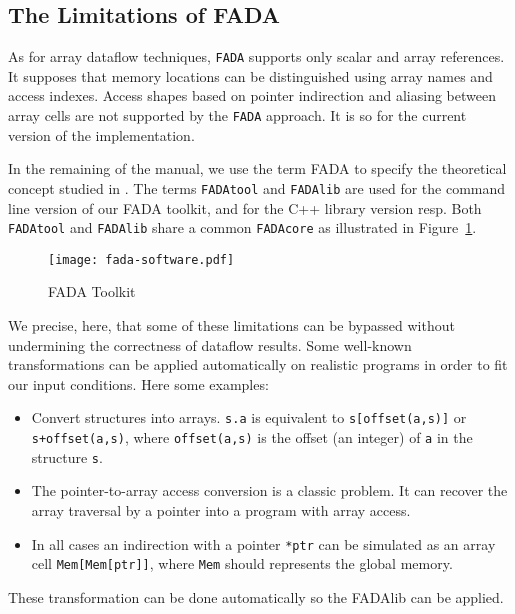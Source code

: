 \subsection{The Limitations of FADA}
As for array dataflow techniques, \verb|FADA| supports only scalar and array references. It supposes that memory locations can be distinguished using array names and access indexes. Access shapes based on pointer indirection and aliasing between array cells are not supported by the \verb|FADA| approach. It is so for the current version of the implementation.

In the remaining of the manual, we use the term FADA to specify the theoretical concept studied in \cite{barthou_thesis}. The terms \verb|FADAtool| and \verb|FADAlib| are used for the command line version of our FADA toolkit, and for the C++ library version resp. Both \verb|FADAtool| and \verb|FADAlib| share a common \verb|FADAcore| as illustrated in Figure~\ref{fig:fadatoolkit}.
\begin{figure}
\begin{center}
 \texttt{[image: fada-software.pdf]}
\end{center}
\caption{FADA Toolkit}
\label{fig:fadatoolkit}
\end{figure} 

We precise, here, that some of these limitations can be bypassed without undermining the correctness of dataflow results. Some well-known transformations can be applied automatically on realistic programs in order to fit our input conditions. Here some examples:
\begin{itemize}
 \item Convert structures into arrays. \verb|s.a| is equivalent to \verb|s[offset(a,s)]| or \verb|s+offset(a,s)|, where \verb|offset(a,s)| is the offset (an integer) of \verb|a| in the structure \verb|s|.
 \item The pointer-to-array access conversion is a classic problem. It can recover the array traversal by a pointer into a program with array access.
 \item In all cases an indirection with a pointer \verb|*ptr| can be simulated as an array cell \verb|Mem[Mem[ptr]]|, where \verb|Mem| should represents the global memory.
\end{itemize}

These transformation can be done automatically so the FADAlib can be applied.
